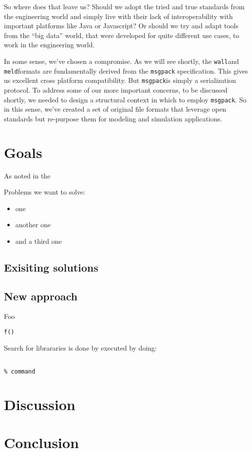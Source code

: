 \documentclass[11pt,a4paper,twocolumn]{article}
\newcommand{\wall}{\texttt{wall}}
\newcommand{\meld}{\texttt{meld}}
\newcommand{\msgpack}{\texttt{msgpack}}
\begin{document}
So where does that leave us?  Should we adopt the tried and true
standards from the engineering world and simply live with their lack
of interoperability with important platforms like Java or Javascript?
Or should we try and adapt tools from the ``big data'' world, that
were developed for quite different use cases, to work in the
engineering world.

In some sense, we've chosen a compromise.  As we will see shortly, the
\wall and \meld formats are fundamentally derived from the
\msgpack\cite{msgpack} specification.  This gives us excellent cross
platform compatibility.  But \msgpack is simply a serialization
protocol.  To address some of our more important concerns, to be
discussed shortly, we needed to design a structural context in which
to employ \msgpack. So in this sense, we've created a set of original
file formats that leverage open standards but re-purpose them for
modeling and simulation applications.

\section{Goals}
\label{sec:background}

As noted in the 

Problems we want to solve:
\begin{itemize}
\item one
\item another one
\item and a third one
\end{itemize}

\subsection{Exisiting solutions}
\label{sec:exist-sol}

\subsection{New approach}
\label{sec:exist-sol}
Foo
\lstset{language=python}
\begin{lstlisting}[frame=single]  % Start your code-block
f()
\end{lstlisting}


Search for librararies is done by executed by doing:
\lstset{language=bash}
\begin{lstlisting}[frame=shadowbox]  % Start your code-block

% command
\end{lstlisting}

\section{Discussion}
\label{sec:discussion}

\section{Conclusion}
\label{sec:conclusion}


\end{document}

